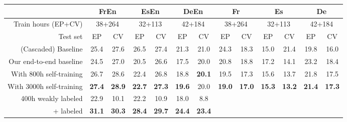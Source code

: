 \documentclass[11pt,a4paper]{article}
\newcommand{\vp}{VoxPopuli}
\begin{document}
 \begin{table*}[t]
    \centering
    \small
    \begin{tabular}{r|cc|cc|cc||cc|cc|cc}
    \toprule
     & \multicolumn{2}{c|}{FrEn } & \multicolumn{2}{c|}{EsEn } & \multicolumn{2}{c||}{DeEn } & \multicolumn{2}{c|}{Fr } & \multicolumn{2}{c|}{Es } & \multicolumn{2}{c}{De }  \\
     \midrule
     Train hours (EP+CV) & \multicolumn{2}{c|}{38+264} & \multicolumn{2}{c|}{32+113} & \multicolumn{2}{c||}{42+184} & \multicolumn{2}{c|}{38+264} & \multicolumn{2}{c|}{32+113} & \multicolumn{2}{c}{42+184} \\
     Test set & EP & CV & EP & CV & EP & CV & EP & CV & EP & CV & EP & CV \\
    \midrule
    (Cascaded) Baseline & 25.4 & 27.6 & 26.5 & 27.4 & 21.3 & 21.0 & 24.3 & 18.3 & 15.0 & 21.4 & 19.8 & 16.0 \\
    Our end-to-end baseline & 24.5 & 27.0 & 20.5 & 26.6 & 17.5 & 20.0 & 20.8 & 18.8 & 17.2 & 14.1 & 23.2 & 18.4 \\
    With 800h self-training & 26.7 & 28.6 & 22.4 & 26.8 & 18.8 & \textbf{20.1} & 19.5 & 17.3 & 15.6 & 13.7 & 21.8 & 17.5 \\
    With 3000h self-training & \textbf{27.4} & \textbf{28.9} & \textbf{22.7} & \textbf{27.3} & \textbf{19.6} & 20.0 & \textbf{19.0} & \textbf{17.0} & \textbf{15.3} & \textbf{13.2} & \textbf{21.4} & \textbf{17.3} \\
\midrule
400h weakly labeled & 22.9 & 10.1 & 22.2 & 10.9 & 18.0 & 8.8 & \\
+ labeled & \textbf{31.1} & \textbf{30.3} & \textbf{28.4} & \textbf{29.7} & \textbf{24.4} & \textbf{23.4} & \\
    \bottomrule
    \end{tabular}
    \caption{\textbf{ST and ASR using \vp~data for self-training or weak supervision.} Left: test BLEU for ST models. Right: test WER for ASR models. We evaluate in-\vp-domain performance with EuroParl-ST (EP) and the out-of-domain performance with CoVoST 2 (CV). We combine both corpora to train our baseline and pseudo-label 3K-hour monolingual \vp~unlabeled data for self-training.
    For ST training with weak supervision, we combine EP, CV and 300h weakly labeled data from \vp. Both approaches for leveraging \vp~data improve in-domain (EP) and out-of-domain (CV) performance simultaneously. ~EP baselines from \citet{iranzo2020europarl} and CV baselines from \citet{wang2020covost}.}
    \label{tab:st_self_training_eval}
\end{table*}
 
\end{document}
